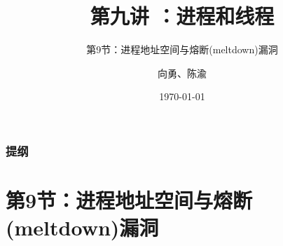 



\title[第9讲]{第九讲 ：进程和线程} %
\subtitle{第9节：进程地址空间与熔断(meltdown)漏洞}
\author{向勇、陈渝} %
\date{\today} %




\begin{frame}
\titlepage %
\end{frame}

\begin{frame}
\frametitle{提纲} %
\tableofcontents %
\end{frame}
\section{第9节：进程地址空间与熔断(meltdown)漏洞}%
